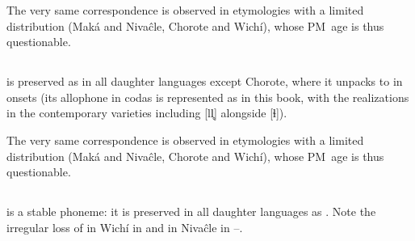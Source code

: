 The very same correspondence is observed in etymologies with a limited distribution (Maká and Nivaĉle, Chorote and Wichí), whose PM~age is thus questionable.

\begin{exe}
    \ex \spin
    \ex \locustmn
    \ex \spitcw
    \ex \ameiva
    \ex \pocote
    \ex \dreamv
    \ex \dreamn
    \ex \tobacco
    \ex \throwpush
    \ex \durmili
    \ex \chachalaca
    \ex \tireddie
    \ex \ashamedcw
    \ex \orphanmn
\end{exe}

\subsection{}\label{proto-lh}
 is preserved as  in all daughter languages except Chorote, where it unpacks to  in onsets (its allophone in codas is represented as  in this book, with the realizations in the contemporary varieties including [ll̥] alongside [ɬ]). 

\begin{exe}
    \ex \burn
    \ex \mortar
    \ex \breath
    \ex \redquebracho
    \ex \answer
    \ex \flu
    \ex \demlh
    \ex \louse
    \ex {}
    \ex \lightfire
    \ex \whitesnail
    \ex \firewoodlhet
    \ex \thread
    \ex \yicalhuk
    \ex \daylhuma
    \ex \girl
    \ex \dayworld
    \ex \rain
    \ex \sprout
    \ex \carrysh
    \ex \spinsew
    \ex \tired
    \ex \rhea
    \ex \rib
    \ex \climb
    \ex \ask
    \ex \iguana
    \ex \othern
    \ex \urinate
    \ex \urine
    \ex \puma
\end{exe}

The very same correspondence is observed in etymologies with a limited distribution (Maká and Nivaĉle, Chorote and Wichí), whose PM~age is thus questionable.

\begin{exe}
    \ex \burnalh
    \ex \spin
    \ex \dreamv
    \ex \dreamn
    \ex \fry
    \ex \heartmn
    \ex \silkfloss
    \ex \onemn
    \ex \fatalha
    \ex \ashamedcw
\end{exe}

\subsection{}\label{proto-s}
 is a stable phoneme: it is preserved in all daughter languages as . Note the irregular loss of  in Wichí in  and in Nivaĉle in --.


